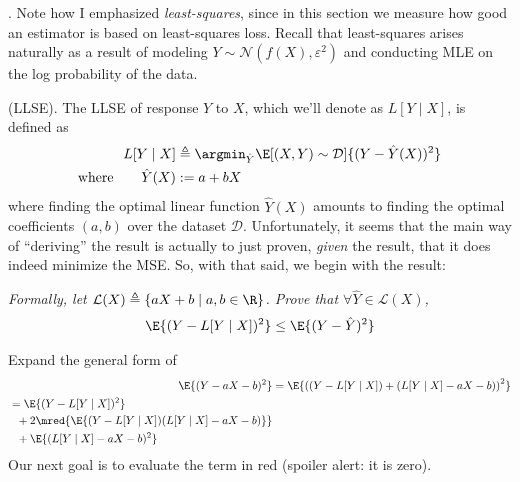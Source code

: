 \documentclass[11pt]{article}
\newcommand\myspace[1][]{\vspace{#1\bigskipamount}}
\newcommand\p{\Needspace{10\baselineskip} \noindent}
\begin{document}
\myspace{}
\p {}. Note how I emphasized \textit{least-squares}, since in this section we measure how good an estimator is based on least-squares loss. Recall that least-squares arises naturally as a result of modeling $Y \sim \mathcal{N}(f(X), \varepsilon^2)$ and conducting MLE on the log probability of the data. 
\begin{compactitem}
	\item {} (LLSE). The LLSE of response $Y$ to $X$, which we'll denote as $L[Y \mid X]$, is defined as 
	\begin{align}
		L[Y \mid X] &\triangleq 
			\argmin_{\hat Y} \E[(X, Y) \sim \mathcal D]{(Y - \hat Y(X))^2} \\
		\text{where}\qquad
		\hat Y(X) &:= a + b X
	\end{align}
	where finding the optimal linear function $\hat Y(X)$ amounts to finding the optimal coefficients $(a, b)$ over the dataset $\mathcal D$. Unfortunately, it seems that the main way of ``deriving'' the result is actually to just proven, \textit{given} the result, that it does indeed minimize the MSE. So, with that said, we begin with the result:
	\begin{algorithm}
		\textit{Formally, let $\mathcal L(X) \triangleq \{ aX + b \mid a, b \in \R \}$. Prove that $\forall \hat{Y} \in \mathcal L(X)$, 
			\begin{align}
				\E{(Y - L[Y \mid X])^2} \le \E{(Y - \hat Y)^2}
			\end{align}
			}
		\tcblower 
		
		\begin{compactenum}
			\item Expand the general form of 
			\begin{align}
				\E{(Y - aX - b)^2}
					&= \E{\left( \left(Y - L[Y \mid X] \right) +  \left(L[Y \mid X] - aX - b \right)  \right)^2} \\
				\begin{split}
					&= \E{(Y - L[Y \mid X])^2} \\
						&~~+ 2 \mred{\E{(Y - L[Y \mid X])(L[Y \mid X] - aX - b)}} \\
						&~~+ \E{(L[Y \mid X] - aX - b)^2}
				\end{split}
			\end{align}
			Our next goal is to evaluate the term in red (spoiler alert: it is zero).
			

\end{compactenum}
\end{algorithm}
\end{compactitem}
\end{document}
